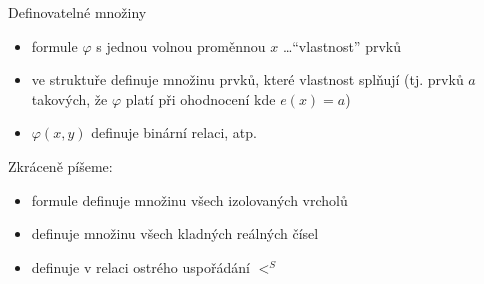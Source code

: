 \documentclass{beamer}
\begin{document}
\begin{frame}{Definovatelné množiny}

    \pause
    \begin{itemize}
        \item formule $\varphi$ s jednou volnou proměnnou $x$ \dots ``vlastnost'' prvků \pause
        \item ve struktuře \alert{definuje} množinu prvků, které vlastnost splňují (tj. prvků $a$ takových, že $\varphi$ platí při ohodnocení kde $e(x)=a$)\pause
        \item $\varphi(x,y)$ definuje binární relaci, atp.\pause
    \end{itemize}
    

    Zkráceně píšeme: \pause

    \begin{itemize}
        \item formule  definuje  množinu všech \alert{izolovaných} vrcholů\pause
        \item {} definuje  množinu všech kladných reálných čísel\pause
        \item {} definuje v  relaci \alert{ostrého uspořádání} $<^S$
    \end{itemize}

\end{frame}
\end{document}
